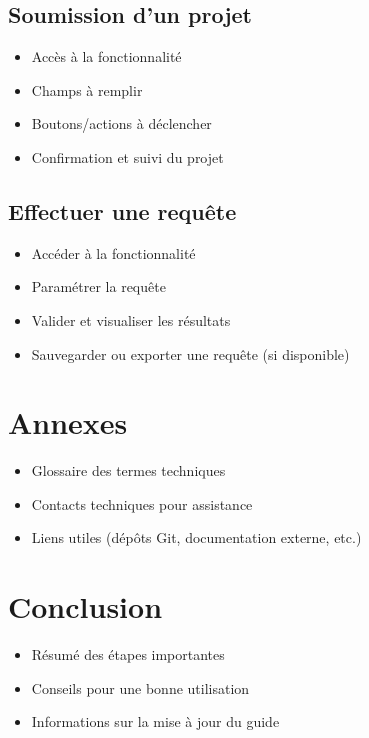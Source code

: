\documentclass[12pt]{article}
\begin{document}
\subsection{Soumission d’un projet}
\begin{itemize}[label=--]
    \item Accès à la fonctionnalité
    \item Champs à remplir
    \item Boutons/actions à déclencher
    \item Confirmation et suivi du projet
\end{itemize}

\subsection{Effectuer une requête}
\begin{itemize}[label=--]
    \item Accéder à la fonctionnalité
    \item Paramétrer la requête
    \item Valider et visualiser les résultats
    \item Sauvegarder ou exporter une requête (si disponible)
\end{itemize}

\section*{Annexes}

\begin{itemize}[label=--]
    \item Glossaire des termes techniques
    \item Contacts techniques pour assistance
    \item Liens utiles (dépôts Git, documentation externe, etc.)
\end{itemize}

\section*{Conclusion}

\begin{itemize}[label=--]
    \item Résumé des étapes importantes
    \item Conseils pour une bonne utilisation
    \item Informations sur la mise à jour du guide
\end{itemize}
\end{document}
